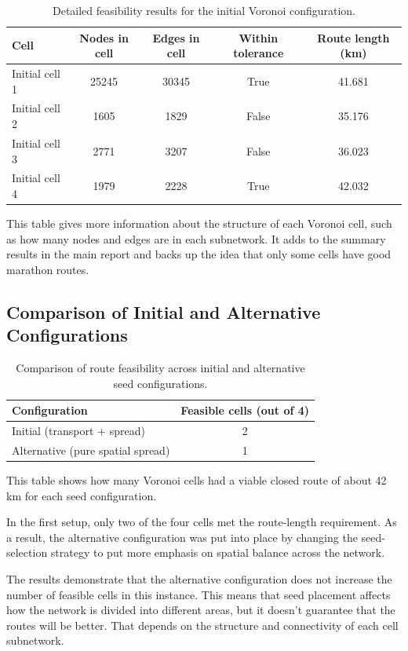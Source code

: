 \documentclass[acmsmall,nonacm,natbib=false]{acmart}
\begin{document}
\begin{table}[H]
\centering
\caption{Detailed feasibility results for the initial Voronoi configuration.}
\begin{tabular}{lcccc}
\toprule
Cell & Nodes in cell & Edges in cell & Within tolerance & Route length (km) \\
\midrule
Initial cell 1 & 25245 & 30345 & True & 41.681 \\
Initial cell 2 & 1605 & 1829 & False & 35.176 \\
Initial cell 3 & 2771 & 3207 & False & 36.023 \\
Initial cell 4 & 1979 & 2228 & True & 42.032 \\
\bottomrule
\end{tabular}
\end{table}

This table gives more information about the structure of each Voronoi cell, such as how many nodes and edges are in each subnetwork. It adds to the summary results in the main report and backs up the idea that only some cells have good marathon routes.

\subsection{Comparison of Initial and Alternative Configurations}
\label{appendix:part2taskC_comparison}

\begin{table}[H]
\centering
\caption{Comparison of route feasibility across initial and alternative seed configurations.}
\begin{tabular}{lc}
\toprule
Configuration & Feasible cells (out of 4) \\
\midrule
Initial (transport + spread) & 2 \\
Alternative (pure spatial spread) & 1 \\
\bottomrule
\end{tabular}
\end{table}

This table shows how many Voronoi cells had a viable closed route of about 42 km for each seed configuration.

In the first setup, only two of the four cells met the route-length requirement. As a result, the alternative configuration was put into place by changing the seed-selection strategy to put more emphasis on spatial balance across the network.

The results demonstrate that the alternative configuration does not increase the number of feasible cells in this instance. This means that seed placement affects how the network is divided into different areas, but it doesn't guarantee that the routes will be better. That depends on the structure and connectivity of each cell subnetwork.
\end{document}
